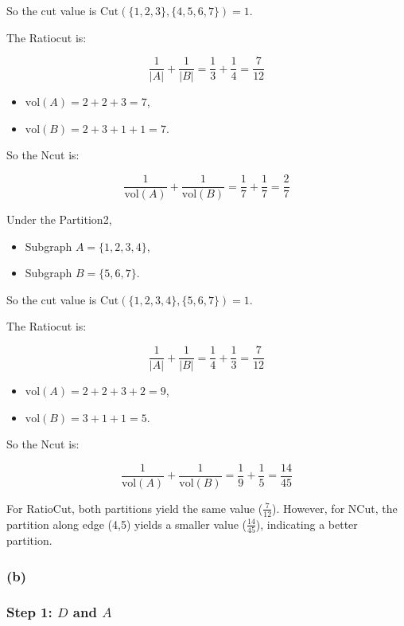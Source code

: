 \documentclass[12pt]{article}
\begin{document}
So the cut value is $\text{Cut}(\{1, 2, 3\}, \{4, 5, 6, 7\}) = 1$. 

The Ratiocut is:

\[\frac{1}{|A|} + \frac{1}{|B|} = \frac{1}{3} + \frac{1}{4} = \frac{7}{12}\]

\begin{itemize}
    \item \( \text{vol}(A) = 2 + 2 + 3 = 7 \),
    \item \( \text{vol}(B) = 2 + 3 + 1 + 1 = 7 \).
\end{itemize}

So the Ncut is:

\[
\frac{1}{\text{vol}(A)} + \frac{1}{\text{vol}(B)} = \frac{1}{7} + \frac{1}{7} = \frac{2}{7}
\]

Under the Partition2,
\begin{itemize}
    \item Subgraph \( A = \{1, 2, 3, 4\} \),
    \item Subgraph \( B = \{5, 6, 7\} \).
\end{itemize}

So the cut value is $\text{Cut}(\{1, 2, 3, 4\}, \{5, 6, 7\}) = 1$.

The Ratiocut is:

\[
 \frac{1}{|A|} + \frac{1}{|B|} = \frac{1}{4} + \frac{1}{3} = \frac{7}{12}
\]

\begin{itemize}
    \item \( \text{vol}(A) = 2 + 2 + 3 + 2 = 9 \),
    \item \( \text{vol}(B) = 3 + 1 + 1 = 5 \).
\end{itemize}

So the Ncut is:

\[
\frac{1}{\text{vol}(A)} + \frac{1}{\text{vol}(B)} = \frac{1}{9} + \frac{1}{5} = \frac{14}{45}
\]

For RatioCut, both partitions yield the same value (\( \frac{7}{12} \)). 
However, for NCut, the partition along edge (4,5) yields a smaller value (\( \frac{14}{45} \)), indicating a better partition.


\subsubsection*{(b)}

\subsubsection*{Step 1: $D$ and $A$}
\end{document}
